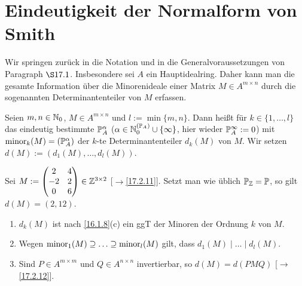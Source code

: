\documentclass[../../main.tex]{subfiles}
\begin{document}
\section{Eindeutigkeit der Normalform von Smith}

Wir springen zurück in die Notation und in die Generalvoraussetzungen von Paragraph $\S 17.1$. Insbesondere sei $A$ ein Hauptidealring. Daher kann man die gesamte Information über die Minorenideale einer Matrix $M\in A^{m\times n}$ durch die sogenannten Determinantenteiler von $M$ erfassen.

\begin{df}\label{17.3.1}
Seien $m,n\in \N_0$, $M\in A^{m\times n}$ und $l:=\min\{m,n\}$. Dann heißt für $k\in\{1,\ldots ,l\}$ das eindeutig bestimmte $\P_A^\alpha$ ($\alpha\in\expfam\cup\{\infty\}$, hier wieder $\P_A^\infty:=0$) mit $\minor_k(M)=(\P_A^\alpha)$ der $k$-te Determinantenteiler $d_k(M)$ von $M$. Wir setzen $d(M):=(d_1(M),\ldots ,d_l(M))$.
\end{df}

\begin{bsp}\label{17.3.2}
Sei $M:=\begin{pmatrix}2 & 4\\-2&2\\0&6\end{pmatrix}\in \Z^{3\times 2}$ [$\to$\ref{17.2.11}]. Setzt man wie üblich $\P_\Z=\P$, so gilt $d(M)=(2,12)$.
\end{bsp}

\begin{bem}\label{17.3.3}
\begin{enumerate}[\normalfont(a)]
\item $d_k(M)$ ist nach \ref{16.1.8}(c) ein ggT der Minoren der Ordnung $k$ von $M$.
\item Wegen $\minor_1(M)\supseteq\ldots \supseteq \minor_l(M)$ gilt, dass $d_1(M)\mid\ldots \mid d_l(M)$.
\item Sind $P\in A^{m\times m}$ und $Q\in A^{n\times n}$ invertierbar, so $d(M)=d(PMQ)$ [$\to$\ref{17.2.12}].
\end{enumerate}
\end{bem}
\end{document}
